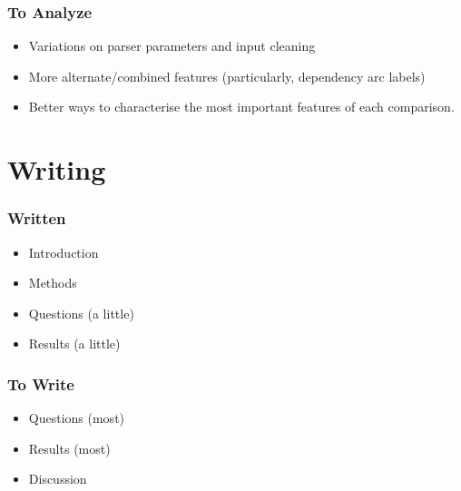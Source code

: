 \documentclass{beamer}
\begin{document}
\begin{frame}
\frametitle{To Analyze}
\begin{itemize}
\item Variations on parser parameters and input cleaning
\item More alternate/combined features (particularly, dependency arc labels)
\item Better ways to characterise the most important features of each
  comparison.
\end{itemize}
\end{frame}


\section{Writing}
\begin{frame}
\frametitle{Written}
\begin{itemize}
\item Introduction
\item Methods
\item Questions (a little)
\item Results (a little)
\end{itemize}
\end{frame}

\begin{frame}
\frametitle{To Write}
\begin{itemize}
\item Questions (most)
\item Results (most)
\item Discussion
\end{itemize}
\end{frame}
\end{document}
